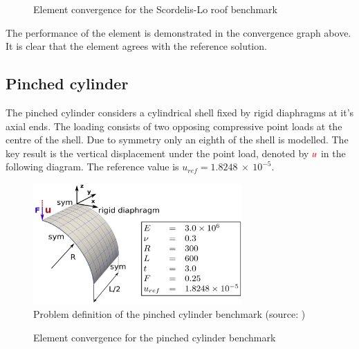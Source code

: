 \pgfplotsset{width=6cm}
\begin{figure}[H]
	\centering
	\caption{Element convergence for the Scordelis-Lo roof benchmark}
	\label{scordelisroofbench}
\end{figure}



The performance of the element is demonstrated in the convergence graph above. It is clear that the element agrees with the reference solution.

\subsection{Pinched cylinder}

The pinched cylinder considers a cylindrical shell fixed by rigid diaphragms at it's axial ends. The loading consists of two opposing compressive point loads at the centre of the shell. Due to symmetry only an eighth of the shell is modelled. The key result is the vertical displacement under the point load, denoted by $\textcolor{red}{u}$ in the following diagram. The reference value is $u_{ref} =  1.8248\ \times\ 10^{-5}$. 

\begin{figure}[H]
	\centering
	\def\svgwidth{\columnwidth}
	\includegraphics[width=8cm]{images/pinchedcylinder.png}
	\caption{Problem definition of the pinched cylinder benchmark (source: \cite{Bou13})}
	\label{pinchedcylinder}
\end{figure}


\pgfplotsset{width=6cm}
\begin{figure}[H]
	\centering
	\caption{Element convergence for the pinched cylinder benchmark}
	\label{pinchedcylinderbench}
\end{figure}



